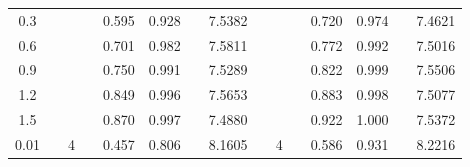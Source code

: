 \documentclass[12pt]{article}
\begin{document}
\begin{table}[!ht]
\begin{threeparttable}
\begin{tabular}{clllcllclllcclc}
0.3                                               &  &                               &  & 0.595                        & 0.928                                           &  & 7.5382                                                                    &  &                               &  & 0.720                                   & 0.974                                 &  & 7.4621                                                                    \\
0.6                                               &  &                               &  & 0.701                        & 0.982                                           &  & 7.5811                                                                    &  &                               &  & 0.772                                  & 0.992                                 &  & 7.5016                                                                    \\
0.9                                               &  &                               &  & 0.750                         & 0.991                                           &  & 7.5289                                                                    &  &                               &  & 0.822                                  & 0.999                                 &  & 7.5506                                                                    \\
1.2                                               &  &                               &  & 0.849                        & 0.996                                           &  & 7.5653                                                                    &  &                               &  & 0.883                                  & 0.998                                 &  & 7.5077                                                                    \\
1.5                                               &  &                               &  & 0.870                         & 0.997                                           &  & 7.4880                                                                     &  &                               &  & 0.922                                  & 1.000                                   &  & 7.5372                                                                    \\ \midrule
0.01                                              &  & 4                             &  & 0.457                        & 0.806                                           &  & 8.1605                                                                    &  & 4                             &  & 0.586                                  & 0.931                                 &  & 8.2216                                                                    \\

\end{tabular}
\end{threeparttable}
\end{table}
\end{document}
